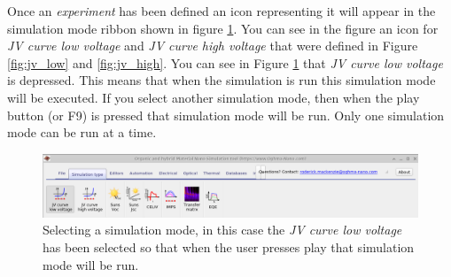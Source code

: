 Once an \emph{experiment} has been defined an icon representing it will appear in the simulation mode ribbon shown in figure \ref{fig:simmodes}. You can see in the figure an icon for \emph{JV curve low voltage} and \emph{JV curve high voltage} that were defined in Figure \ref{fig:jv_low} and \ref{fig:jv_high}. You can see in Figure \ref{fig:simmodes} that \emph{JV curve low voltage} is depressed. This means that when the simulation is run this simulation mode will be executed. If you select another simulation mode, then when the play button (or F9) is pressed that simulation mode will be run. Only one simulation mode can be run at a time.


\begin{figure}[H]
\centering
\includegraphics[width=\linewidth,height=0.2\linewidth]{./images/sim_editors/ribbon_sim_modes.png}
\caption{Selecting a simulation mode, in this case the \emph{JV curve low voltage} has been selected so that when the user presses play that simulation mode will be run.}
\label{fig:simmodes}
\end{figure}














